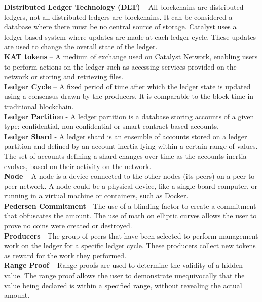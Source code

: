 \textbf{Distributed Ledger Technology (DLT)} – All blockchains are distributed ledgers, not all distributed ledgers are blockchains. It can be considered a database where there must be no central source of storage. Catalyst uses a ledger-based system where updates are made at each ledger cycle. These updates are used to change the overall state of the ledger. \\

\textbf{KAT tokens} – A medium of exchange used on Catalyst Network, enabling users to perform actions on the ledger such as accessing services provided on the network or storing and retrieving files. \\

\textbf{Ledger Cycle} – A fixed period of time after which the ledger state is updated using a consensus drawn by the producers. It is comparable to the block time in traditional blockchain. \\

\textbf{Ledger Partition} - A ledger partition is a database storing accounts of a given type: confidential, non-confidential or smart-contract based accounts. \\

\textbf{Ledger Shard} - A ledger shard is an ensemble of accounts stored on a ledger partition and defined  by an account inertia lying within a certain range of values. The set of accounts defining a shard changes over time as the accounts inertia evolves, based on their activity on the network. \\

\textbf{Node} – A node is a device connected to the other nodes (its peers) on a peer-to-peer network. A node could be a physical device, like a single-board computer, or running in a virtual machine or containers, such as Docker. \\

\textbf{Pedersen Commitment} - The use of a blinding factor to create a commitment that obfuscates the amount. The use of math on elliptic curves allows the user to prove no coins were created or destroyed. \\

\textbf{Producers} - The group of peers that have been selected to perform management work on the ledger for a specific ledger cycle. These producers collect new tokens as reward for the work they performed. \\

\textbf{Range Proof} – Range proofs are used to determine the validity of a hidden value. The range proof allows the user to demonstrate unequivocally that the value being declared is within a specified range, without revealing the actual amount. \\

